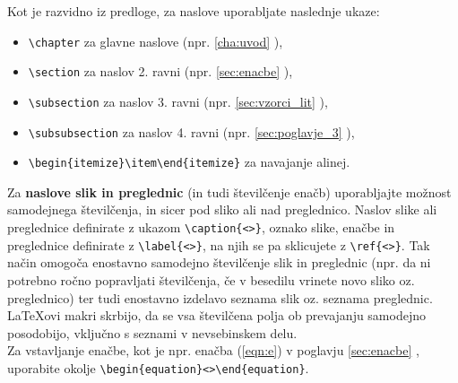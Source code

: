 Kot je razvidno iz predloge, za naslove uporabljate naslednje ukaze:
\begin{itemize}
\item \verb|\chapter| za glavne naslove (npr. \ref{cha:uvod} ),
\item \verb|\section| za naslov 2. ravni (npr. \ref{sec:enacbe} ),
\item \verb|\subsection| za naslov 3. ravni (npr. \ref{sec:vzorci_lit} ),
\item \verb|\subsubsection| za naslov 4. ravni (npr. \ref{sec:poglavje_3} ),
\item \verb|\begin{itemize}\item\end{itemize}| za navajanje alinej.
\end{itemize}

Za \textbf{naslove slik in preglednic} (in tudi številčenje enačb) uporabljajte možnost samodejnega številčenja, in sicer pod sliko ali nad preglednico. Naslov slike ali preglednice definirate z ukazom \verb|\caption{<>}|, oznako slike, enačbe in preglednice definirate z \verb|\label{<>}|, na njih se pa sklicujete z \verb|\ref{<>}|. Tak način omogoča enostavno samodejno številčenje slik in preglednic (npr. da ni potrebno ročno popravljati številčenja, če v besedilu vrinete novo sliko oz. preglednico) ter tudi enostavno izdelavo seznama slik oz. seznama preglednic. \LaTeX ovi makri skrbijo, da se vsa številčena polja ob prevajanju samodejno posodobijo, vključno s seznami v nevsebinskem delu.\\

Za vstavljanje enačbe, kot je npr. enačba (\ref{eqn:e}) v poglavju \ref{sec:enacbe} , uporabite okolje \verb|\begin{equation}<>\end{equation}|.

